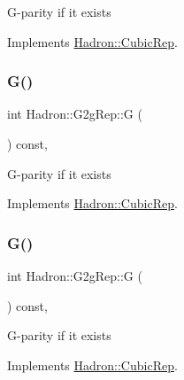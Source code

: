 G-\/parity if it exists 

Implements \mbox{\hyperlink{structHadron_1_1CubicRep_a52104e43266d1614c00bbd1c3b395458}{Hadron\+::\+Cubic\+Rep}}.

\mbox{\label{structHadron_1_1G2gRep_a417bc3b0be59398720597ac859ab6b69}} 
\subsubsection{\texorpdfstring{G()}{G()}\hspace{0.1cm}{\footnotesize\ttfamily [2/3]}}
{\footnotesize\ttfamily int Hadron\+::\+G2g\+Rep\+::G (\begin{DoxyParamCaption}{ }\end{DoxyParamCaption}) const\hspace{0.3cm}{\ttfamily [inline]}, {\ttfamily [virtual]}}

G-\/parity if it exists 

Implements \mbox{\hyperlink{structHadron_1_1CubicRep_a52104e43266d1614c00bbd1c3b395458}{Hadron\+::\+Cubic\+Rep}}.

\mbox{\label{structHadron_1_1G2gRep_a417bc3b0be59398720597ac859ab6b69}} 
\subsubsection{\texorpdfstring{G()}{G()}\hspace{0.1cm}{\footnotesize\ttfamily [3/3]}}
{\footnotesize\ttfamily int Hadron\+::\+G2g\+Rep\+::G (\begin{DoxyParamCaption}{ }\end{DoxyParamCaption}) const\hspace{0.3cm}{\ttfamily [inline]}, {\ttfamily [virtual]}}

G-\/parity if it exists 

Implements \mbox{\hyperlink{structHadron_1_1CubicRep_a52104e43266d1614c00bbd1c3b395458}{Hadron\+::\+Cubic\+Rep}}.

\mbox{\label{structHadron_1_1G2gRep_a37c28b88ae6f2d60b60465e5cc62126d}} 
